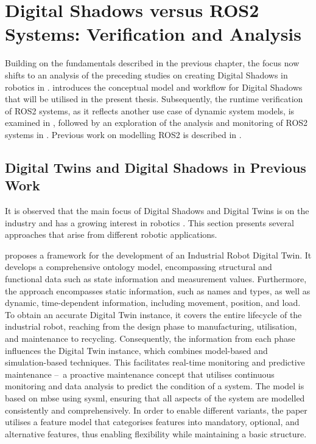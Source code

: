 \chapter{Digital Shadows versus ROS2 Systems: Verification and Analysis} \label{chap:sota}

Building on the fundamentals described in the previous chapter, the focus now shifts to an analysis of the preceding studies on creating Digital Shadows in robotics in .  introduces the conceptual model and workflow for Digital Shadows that will be utilised in the present thesis. Subsequently, the runtime verification of ROS2 systems, as it reflects another use case of dynamic system models, is examined in , followed by an exploration of the analysis and monitoring of ROS2 systems in . Previous work on modelling ROS2 is described in .


\section{Digital Twins and Digital Shadows in Previous Work} \label{sec:DShadows}
It is observed that the main focus of Digital Shadows and Digital Twins is on the industry \cite[p.~375]{digitaltwinmodelling} and has a growing interest in robotics \cite[p.~4]{mazumder2023towards}. This section presents several approaches that arise from different robotic applications.

\Textcite{IndustrialRobotDigitalTwin} proposes a framework for the development of an Industrial Robot Digital Twin. It develops a comprehensive ontology model, encompassing structural and functional data such as state information and measurement values. Furthermore, the approach encompasses static information, such as names and types, as well as dynamic, time-dependent information, including movement, position, and load.
To obtain an accurate Digital Twin instance, it covers the entire lifecycle of the industrial robot, reaching from the design phase to manufacturing, utilisation, and maintenance to recycling. Consequently, the information from each phase influences the Digital Twin instance, which combines model-based and simulation-based techniques. This facilitates real-time monitoring and predictive maintenance --~a proactive maintenance concept that utilises continuous monitoring and data analysis to predict the condition of a system. The model is based on \ac{mbse} using \ac{sysml}, ensuring that all aspects of the system are modelled consistently and comprehensively. In order to enable different variants, the paper utilises a feature model that categorises features into mandatory, optional, and alternative features, thus enabling flexibility while maintaining a basic structure.

